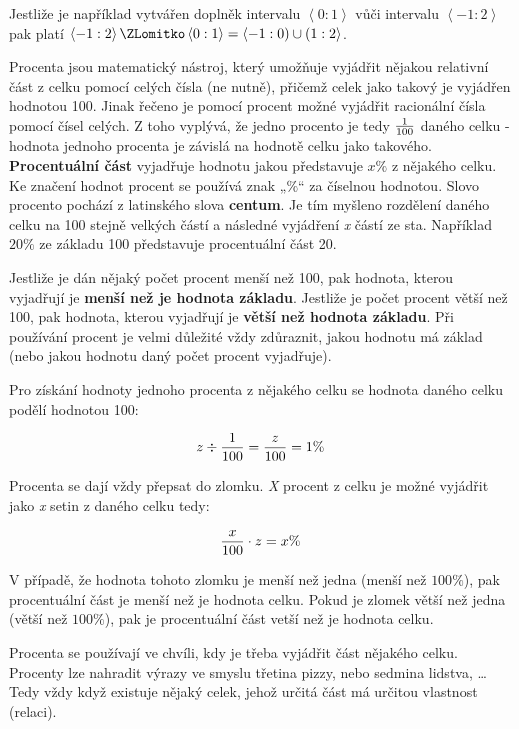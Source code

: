 \vskip 4mm
\centerline{}
\vskip 4mm

Jestliže je například vytvářen doplněk intervalu $ \left< 0:1 \right> $ vůči intervalu $ \left< -1:2 \right> $ pak platí $ \left< -1:2 \right> \ZLomitko \left< 0:1 \right> = \left< -1:0\right) \cup \left(1:2 \right> $.


Procenta jsou matematický nástroj, který umožňuje vyjádřit nějakou relativní část z celku pomocí celých čísla (ne nutně), přičemž celek jako takový je vyjádřen hodnotou 100. Jinak řečeno je pomocí procent možné vyjádřit racionální čísla pomocí čísel celých. Z toho vyplývá, že jedno procento je tedy $ 1\over 100 $ daného celku - hodnota jednoho procenta je závislá na hodnotě celku jako takového. {\bf Procentuální část} vyjadřuje hodnotu jakou představuje $x\%$ z nějakého celku. Ke značení hodnot procent se používá znak „$\%$“ za číselnou hodnotou. Slovo procento pochází z latinského slova {\bf centum}. Je tím myšleno rozdělení daného celku na 100 stejně velkých částí a následné vyjádření {\it x} částí ze sta. Například $20\%$ ze základu 100 představuje procentuální část 20.

Jestliže je dán nějaký počet procent menší než 100, pak hodnota, kterou vyjadřují je {\bf menší než je hodnota základu}. Jestliže je počet procent větší než 100, pak hodnota, kterou vyjadřují je {\bf větší než hodnota základu}. Při používání procent je velmi důležité vždy zdůraznit, jakou hodnotu má základ (nebo jakou hodnotu daný počet procent vyjadřuje).

Pro získání hodnoty jednoho procenta z nějakého celku se hodnota daného celku podělí hodnotou 100:

$$ z \div {1\over 100} = {z \over 100} = 1\% $$

Procenta se dají vždy přepsat do zlomku. {\it X} procent z celku je možné vyjádřit jako {\it x} setin z daného celku tedy:

$$ { x \over 100}\cdot z = x\% $$

V případě, že hodnota tohoto zlomku je menší než jedna (menší než $100\%$), pak procentuální část je menší než je hodnota celku. Pokud je zlomek větší než jedna (větší než $100\%$), pak je procentuální část vetší než je hodnota celku.

Procenta se používají ve chvíli, kdy je třeba vyjádřit část nějakého celku. Procenty lze nahradit výrazy ve smyslu třetina pizzy, nebo sedmina lidstva, … Tedy vždy když existuje nějaký celek, jehož určitá část má určitou vlastnost (relaci).

